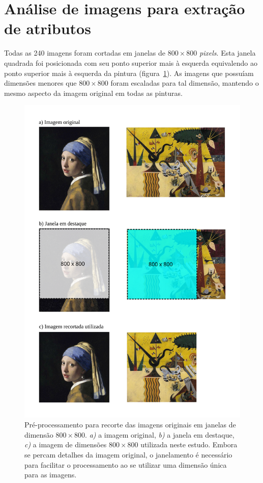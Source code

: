 \section{Análise de imagens para extração de atributos}
\label{sec:analiseimagens}

Todas as 240 imagens foram cortadas em janelas de $800\times800$
\textit{pixels}. Esta janela quadrada foi posicionada com seu ponto superior
mais à esquerda equivalendo ao ponto superior mais à esquerda da
pintura (figura~\ref{fig:janelamento}). As imagens que possuíam
dimensões menores que $800\times800$ foram escaladas para tal
dimensão, mantendo o mesmo aspecto da imagem original em todas as
pinturas.

\begin{figure}[h!]
\begin{center}
        \caption{Pré-processamento para recorte das imagens originais em
        janelas de dimensão $800\times800$. \textit{a)} a imagem
        original, \textit{b)} a janela em destaque, \textit{c)} a
        imagem de dimensões $800\times800$ utilizada neste
        estudo. Embora se percam detalhes da imagem original, o
        janelamento é necessário para facilitar o processamento ao se
        utilizar uma dimensão única para as imagens.}
        \label{fig:janelamento}
        \includegraphics[scale=0.9]{figs/passos_janelamento}
      \fonteminha
\end{center}
\end{figure}

